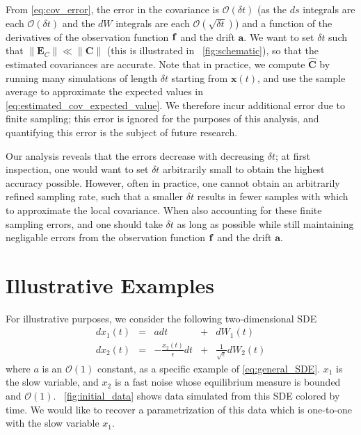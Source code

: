 %
From \eqref{eq:cov_error}, the error in the covariance is $\mathcal{O}(\delta t)$ (as the $ds$ integrals are each $\mathcal{O}(\delta t)$ and the $dW$ integrals are each $\mathcal{O}(\sqrt{\delta t})$) and a function of the derivatives of the observation function $\mathbf{f}$ and the drift $\mathbf{a}$.
%
We want to set $\delta t$ such that $\|\mathbf{E}_C \| \ll \| \mathbf{C} \|$
(this is illustrated in \fig~\ref{fig:schematic}), so that the estimated covariances are accurate.
%
Note that in practice, we compute $\hat{\mathbf{C}}$ by running many simulations of length $\delta t$ starting from $\mathbf{x}(t)$, and use the sample average to approximate the expected values in \eqref{eq:estimated_cov_expected_value}.
%
We therefore incur additional error due to finite sampling; this error is ignored for the purposes of this analysis, and quantifying this error is the subject of future research.

Our analysis reveals that the errors decrease with decreasing $\delta t$; at first inspection, one would want to set $\delta t$ arbitrarily small to obtain the highest accuracy possible.
%
However, often in practice, one cannot obtain an arbitrarily refined sampling rate, such that a smaller $\delta t$ results in fewer samples with which to approximate the local covariance.%
When also accounting for these finite sampling errors, and one should take $\delta t$ as long as possible while still maintaining negligable errors from the observation function $\mathbf{f}$ and the drift $\mathbf{a}$.

\section{Illustrative Examples}

For illustrative purposes, we consider the following two-dimensional SDE
\begin{equation} \label{eq:specific_SDE}
\begin{aligned}
dx_1(t) &=& adt &+& dW_1(t)\\
dx_2(t) &=& -\frac{x_2(t)}{\epsilon} dt &+& \frac{1}{\sqrt{\epsilon}} dW_2(t)
\end{aligned}
\end{equation}
%
where $a$ is an $\mathcal{O}(1)$ constant, as a specific example of \eqref{eq:general_SDE}.
%
$x_1$ is the slow variable, and $x_2$ is a fast noise whose equilibrium measure is bounded and $\mathcal{O}(1)$.
%
\fig~\ref{fig:initial_data} shows data simulated from this SDE colored by time.
%
We would like to recover a parametrization of this data which is one-to-one with the slow variable $x_1$.

